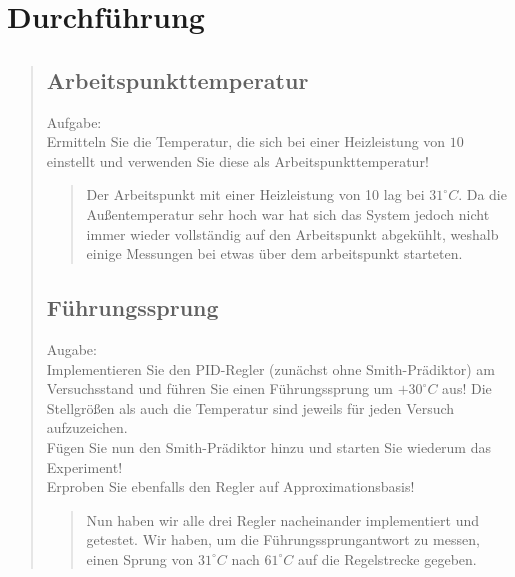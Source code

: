 \section{Durchführung}
\begin{quote}
    
    
    \subsection{Arbeitspunkttemperatur}
    \begin{quote}
        
    \end{quote}
    Aufgabe:\\
    Ermitteln Sie die Temperatur, die sich bei einer Heizleistung von $10$ einstellt und verwenden Sie diese als
    Arbeitspunkttemperatur!\vspace{1em}
    
    \begin{quote}
        
        Der Arbeitspunkt mit einer Heizleistung von 10 lag bei $31^{\circ} C$. Da die Außentemperatur sehr hoch war hat
        sich das System jedoch nicht immer wieder vollständig auf den Arbeitspunkt abgekühlt, weshalb einige Messungen bei etwas über dem
        arbeitspunkt starteten.\\
        
        
    \end{quote}
    
    
    
    \subsection{Führungssprung}
    
    Augabe:\\
    Implementieren Sie den PID-Regler (zunächst ohne Smith-Prädiktor) am Versuchsstand und führen Sie einen
    Führungssprung um $+30^{\circ} C$ aus! Die Stellgrößen als auch die Temperatur sind jeweils für jeden Versuch
    aufzuzeichen.\\
    Fügen Sie nun den Smith-Prädiktor hinzu und starten Sie wiederum das Experiment!\\
    Erproben Sie ebenfalls den Regler auf Approximationsbasis!\vspace{1em}
    
    
    
    \begin{quote}
        Nun haben wir alle drei Regler nacheinander implementiert und getestet. Wir haben, um die Führungssprungantwort zu
        messen, einen Sprung von $31^{\circ} C$ nach $61^{\circ} C$ auf die Regelstrecke gegeben.\\
        

\end{quote}
\end{quote}
